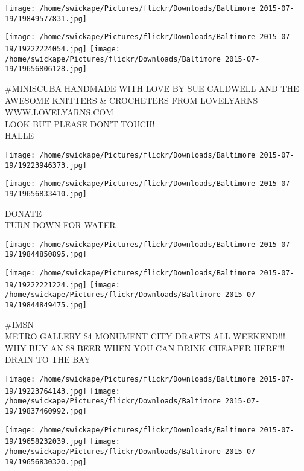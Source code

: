 \documentclass[10pt,letterpaper]{article}
\begin{document}
\texttt{[image: /home/swickape/Pictures/flickr/Downloads/Baltimore 2015-07-19/19849577831.jpg]}

\vspace{0.25in}
\texttt{[image: /home/swickape/Pictures/flickr/Downloads/Baltimore 2015-07-19/19222224054.jpg]}
\texttt{[image: /home/swickape/Pictures/flickr/Downloads/Baltimore 2015-07-19/19656806128.jpg]}

\#MINISCUBA HANDMADE WITH LOVE BY SUE CALDWELL AND THE AWESOME KNITTERS \& CROCHETERS FROM LOVELYARNS WWW.LOVELYARNS.COM\\
LOOK BUT PLEASE DON'T TOUCH!\\
HALLE\\
\pagebreak

\texttt{[image: /home/swickape/Pictures/flickr/Downloads/Baltimore 2015-07-19/19223946373.jpg]}

\vspace{0.25in}
\texttt{[image: /home/swickape/Pictures/flickr/Downloads/Baltimore 2015-07-19/19656833410.jpg]}

DONATE\\
TURN DOWN FOR WATER\\
\pagebreak

\texttt{[image: /home/swickape/Pictures/flickr/Downloads/Baltimore 2015-07-19/19844850895.jpg]}

\vspace{0.25in}
\texttt{[image: /home/swickape/Pictures/flickr/Downloads/Baltimore 2015-07-19/19222221224.jpg]}
\texttt{[image: /home/swickape/Pictures/flickr/Downloads/Baltimore 2015-07-19/19844849475.jpg]}

\#IMSN\\
METRO GALLERY \$4 MONUMENT CITY DRAFTS ALL WEEKEND!!!  WHY BUY AN \$8 BEER WHEN YOU CAN DRINK CHEAPER HERE!!!\\
DRAIN TO THE BAY\\
\pagebreak

\texttt{[image: /home/swickape/Pictures/flickr/Downloads/Baltimore 2015-07-19/19223764143.jpg]}
\texttt{[image: /home/swickape/Pictures/flickr/Downloads/Baltimore 2015-07-19/19837460992.jpg]}

\texttt{[image: /home/swickape/Pictures/flickr/Downloads/Baltimore 2015-07-19/19658232039.jpg]}
\texttt{[image: /home/swickape/Pictures/flickr/Downloads/Baltimore 2015-07-19/19656830320.jpg]}
\end{document}
